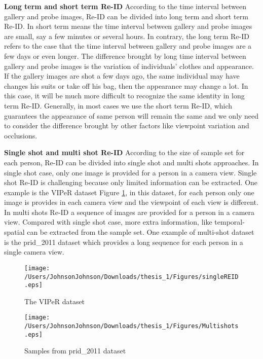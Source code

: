 \textbf{Long term and short term Re-ID} According to the time interval between gallery and probe images, Re-ID can be divided into long term and short term Re-ID.  In short term means the time interval between gallery and probe images are small, say a few minutes or several hours. In contrary, the long term Re-ID refers to the case that the time interval between gallery and probe images are a few days or even longer. The difference brought by long time interval between gallery and probe images is the variation of individuals' clothes and appearance. If the gallery images are shot a few days ago, the same individual may have changes his suits or take off his bag, then the appearance may change a lot. In this case, it will be much more difficult to recognize the same identity in long term Re-ID. Generally, in most cases we use the short term Re-ID, which guarantees the appearance of same person will remain the same and we only need to consider the difference brought by other factors like viewpoint variation and occlusions.


\textbf{Single shot and multi shot Re-ID} According to the size of sample set for each person, Re-ID can be divided into single shot and multi shots approaches. In single shot case, only one image is provided for a person in a camera view. Single shot Re-ID is challenging because only limited information can be extracted. One example is the VIPeR dataset Figure \ref{VIPeRimages}, in this dataset, for each person only one image is provides in each camera view and the viewpoint of each view is different. In multi shots Re-ID a sequence of images are provided for a person in a camera view. Compared with single shot case, more extra information, like temporal-spatial can be extracted from the sample set. One example of multi-shot dataset is the prid\_2011 dataset which provides a long sequence for each person in a single camera view.

\begin{figure}[H]

\texttt{[image: /Users/JohnsonJohnson/Downloads/thesis\_1/Figures/singleREID.eps]}
\vspace{-3em}
\caption{The VIPeR dataset}
\label{VIPeRimages}
\end{figure}


\begin{figure}[H]

\texttt{[image: /Users/JohnsonJohnson/Downloads/thesis\_1/Figures/Multishots.eps]}
\vspace{-3em}
\caption{Samples from prid\_2011 dataset}

\end{figure}


